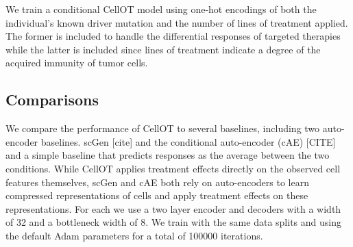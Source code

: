 We train a conditional CellOT model using one-hot encodings of both the individual’s known driver mutation and the number of lines of treatment applied. The former is included to handle the differential responses of targeted therapies while the latter is included since lines of treatment indicate a degree of the acquired immunity of tumor cells.

\subsection{Comparisons}
We compare the performance of CellOT to several baselines, including two auto-encoder baselines. scGen [cite] and the conditional auto-encoder (cAE) [CITE] and a simple baseline that predicts responses as the average between the two conditions. While CellOT applies treatment effects directly on the observed cell features themselves, scGen and cAE both rely on auto-encoders to learn compressed representations of cells and apply treatment effects on these representations. For each we use a two layer encoder and decoders with a width of 32 and a bottleneck width of 8. We train with the same data splits and using the default Adam parameters for a total of 100000 iterations.
